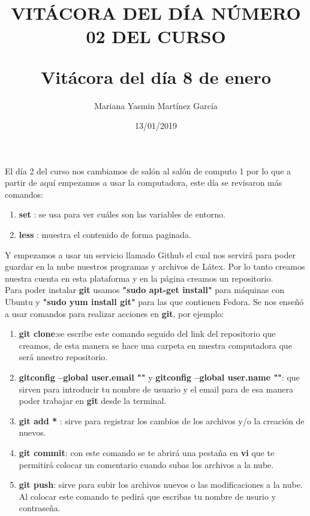 \documentclass[letterpaper, 12pt, twoside]{article}
\title{\Huge\item\color{red}\textbf {VITÁCORA DEL DÍA NÚMERO 02 DEL CURSO}}
\author{Mariana Yasmin Martínez García}
\date{13/01/2019}
\begin{document}
	\maketitle
	
	\newpage
	\title{\huge\textbf{Vitácora del día 8 de enero\\}}
	El día 2 del curso nos cambiamos de salón al salón de computo 1 por lo que a partir de aquí empezamos a usar la computadora, este día se revisaron más comandos:
	\begin{enumerate}
		\item \textbf{\large set }: se usa para ver cuáles son las variables de entorno.
		\item \textbf{\large less }: muestra el contenido de forma paginada.
		
	\end{enumerate}
    Y empezamos a usar un servicio llamado Github el cual nos servirá para poder guardar en la nube nuestros programas y archivos de Látex.
    Por lo tanto creamos nuestra cuenta en esta plataforma y en la página creamos un repositorio. \\
    Para poder instalar \textbf{git} usamos \textbf{"sudo apt-get install"} para máquinas con Ubuntu y \textbf{"sudo yum install git"} para las que contienen Fedora. Se nos enseñó a usar comandos para realizar acciones en \textbf{git}, por ejemplo:
    \begin{enumerate}
    	\item\textbf{\large git clone}:se escribe este comando seguido del link del repositorio que creamos, de esta manera se hace una carpeta en nuestra computadora que será nuestro repositorio. 
    	\item\textbf{\large gitconfig --global user.email ""} y \textbf{ \large gitconfig --global user.name ""}: que sirven para introducir tu nombre de usuario y el email para de esa manera poder trabajar en \textbf{git} desde la terminal.
    	\item\textbf{\large git add * }: sirve para registrar los cambios de los archivos y/o la creación de nuevos.
    	\item\textbf{\large git commit}: con este comando se te abrirá una pestaña en \textbf{vi} que te permitirá colocar un comentario cuando subas los archivos a la nube.
    	\item\textbf{\large git push}: sirve para subir los archivos nuevos o las modificaciones a la nube. Al colocar este comando te pedirá que escribas tu nombre de usurio y contraseña.
    \end{enumerate}
\end{document}
